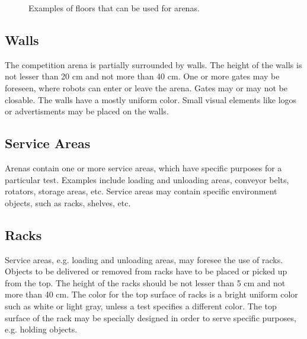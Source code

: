 \begin{figure}
\begin{center}
\end{center}

\caption{Examples of floors that can be used for \RCAW arenas.}
\label{example_floors}
\end{figure}

\subsection{Walls}
The competition arena is partially surrounded by walls. The height of the walls is not lesser than 20 cm and not more than 40 cm. One or more gates may be foreseen, where robots can enter or leave the arena. Gates may or may not be closable. The walls have a mostly uniform color. Small visual elements like logos or advertisments may be placed on the walls.

\subsection{Service Areas}
Arenas contain one or more service areas, which have specific purposes for a particular test. Examples include loading and unloading areas, conveyor belts, rotators, storage areas, etc. Service areas may contain specific environment objects, such as racks, shelves, etc.

\subsection{Racks}
Service areas, e.g. loading and unloading areas, may foresee the use of racks. Objects to be delivered or removed from racks have to be placed or picked up from the top. The height of the racks should be not lesser than 5 cm and not more than 40 cm. The color for the top surface of racks is a bright uniform color such as white or light gray, unless a test specifies a different color. The top surface of the rack may be specially designed in order to serve specific purposes, e.g. holding objects.

